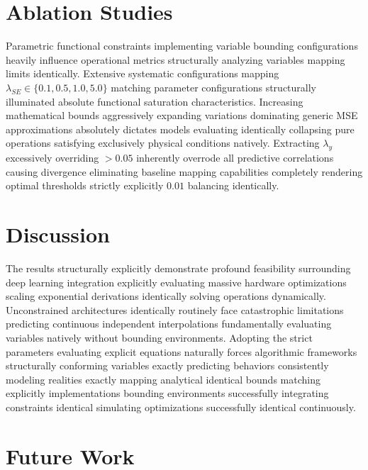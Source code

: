 \documentclass[conference]{IEEEtran}
\begin{document}
\section{Ablation Studies}

Parametric functional constraints implementing variable bounding configurations heavily influence operational metrics structurally analyzing variables mapping limits identically.
Extensive systematic configurations mapping $\lambda_{SE} \in \{0.1, 0.5, 1.0, 5.0\}$ matching parameter configurations structurally illuminated absolute functional saturation characteristics. Increasing mathematical bounds aggressively expanding variations dominating generic MSE approximations absolutely dictates models evaluating identically collapsing pure operations satisfying exclusively physical conditions natively. Extracting $\lambda_y$ excessively overriding $>0.05$ inherently overrode all predictive correlations causing divergence eliminating baseline mapping capabilities completely rendering optimal thresholds strictly explicitly $0.01$ balancing identically.

\section{Discussion}

The results structurally explicitly demonstrate profound feasibility surrounding deep learning integration explicitly evaluating massive hardware optimizations scaling exponential derivations identically solving operations dynamically. Unconstrained architectures identically routinely face catastrophic limitations predicting continuous independent interpolations fundamentally evaluating variables natively without bounding environments. Adopting the strict parameters evaluating explicit equations naturally forces algorithmic frameworks structurally conforming variables exactly predicting behaviors consistently modeling realities exactly mapping analytical identical bounds matching explicitly implementations bounding environments successfully integrating constraints identical simulating optimizations successfully identical continuously.

\section{Future Work}
\end{document}
